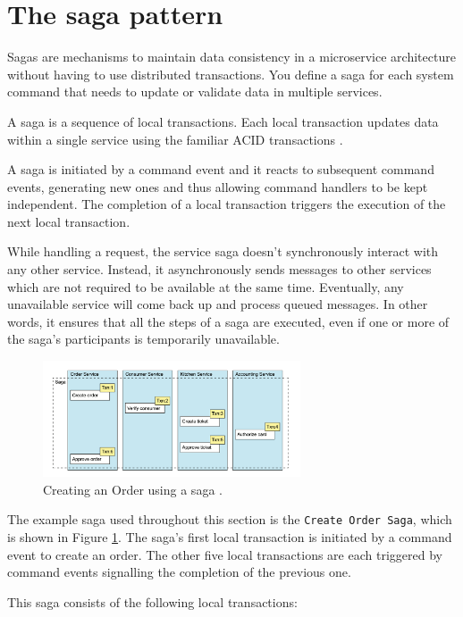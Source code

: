 \documentclass[conference]{IEEEtran}
\begin{document}
\section{The saga pattern}

Sagas are mechanisms to maintain data consistency in a microservice architecture without having to use distributed transactions. You define a saga for each system command that needs to update or validate data in multiple services.

A saga is a sequence of local transactions. Each local transaction updates data within a single service using the familiar ACID transactions \cite{microservices-patterns-saga}.

A saga is initiated by a command event and it reacts to subsequent command events, generating new ones and thus allowing command handlers to be kept independent. The completion of a local transaction triggers the execution of the next local transaction.

While handling a request, the service saga doesn't synchronously interact with any other service. Instead, it asynchronously sends messages to other services which are not required to be available at the same time. Eventually, any unavailable service will come back up and process queued messages. In other words, it ensures that all the steps of a saga are executed, even if one or more of the saga's participants is temporarily unavailable.

\begin{figure}[!htbp]
\centering
\includegraphics[width=3in]{jpeg/order-saga}
\caption{Creating an Order using a saga \cite{microservices-patterns-saga}.}
\label{order_saga}
\end{figure}

The example saga used throughout this section is the \texttt{Create Order Saga}, which is shown in Figure \ref{order_saga}. The saga's first local transaction is initiated by a command event to create an order. The other five local transactions are each triggered by command events signalling the completion of the previous one.

This saga consists of the following local transactions:
\end{document}
